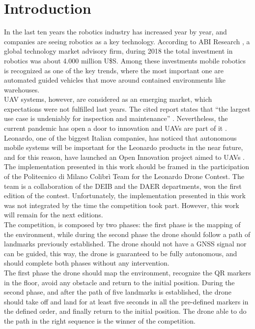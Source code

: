 \cleardoublepage
\chapter{Introduction}
\label{ch:chapter0:intro}
In the last ten years the robotics industry has increased year by year, and companies are seeing robotics as a key technology. According to ABI Research \cite{abi-report}, a global technology market advisory firm, during 2018 the total investment in robotics was about 4.000 million U\$S. Among these investments mobile robotics is recognized as one of the key trends, where the most important one are automated guided vehicles that move around contained environments like warehouses. \\

\ac{UAV} systems, however, are considered as an emerging market, which expectations were not fulfilled last years. The cited report states that \enquote{the largest use case is undeniably for inspection and maintenance} \cite{abi-report}. Nevertheless, the current pandemic has open a door to innovation and UAVs are part of it \cite{eu-robotics-covid}. Leonardo, one of the biggest Italian companies, has noticed that autonomous mobile systems will be important for the Leonardo products in the near future, and for this reason, have launched an Open Innovation project aimed to UAVs \cite{leonardo-drone-contest}.\\

The implementation presented in this work should be framed in the participation of the Politecnico di Milano Colibrì Team for the Leonardo Drone Contest. The team is a collaboration of the DEIB and the DAER departments, won the first edition of the contest. Unfortunately, the implementation presented in this work was not integrated by the time the competition took part. However, this work will remain for the next editions.\\

The competition, is composed by two phases: the first phase is the mapping of the environment, while during the second phase the drone should follow a path of landmarks previously established. The drone should not have a GNSS signal nor can be guided, this way, the drone is guaranteed to be fully autonomous, and should complete both phases without any intervention.\\

The first phase the drone should map the environment, recognize the QR markers in the floor, avoid any obstacle and return to the initial position. During the second phase, and after the path of five landmarks is established, the drone should take off and land for at least five seconds in all the pre-defined markers in the defined order, and finally return to the initial position. The drone able to do the path in the right sequence is the winner of the competition. \\

